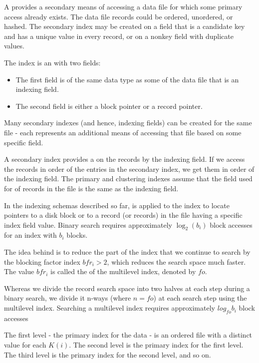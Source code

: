     \par A  provides a secondary means of accessing a data file for which some primary access already exists. The data file records could be ordered, unordered, or hashed. The secondary index may be created on a field that is a candidate key and has a unique value in every record, or on a nonkey field with duplicate values.
    \par The index is an  with two fields:
    \begin{itemize}
      \item The first field is of the same data type as some  of the data file that is an indexing field.
      \item The second field is either a block pointer or a record pointer.
    \end{itemize}
    \par Many secondary indexes (and hence, indexing fields) can be created for the same file - each represents an additional means of accessing that file based on some specific field.
    \par A secondary index provides a  on the records by the indexing field. If we access the records in order of the entries in the secondary index, we get them in order of the indexing field. The primary and clustering indexes assume that the field used for  of records in the file is the same as the indexing field.

  \par In the indexing schemas described so far,  is applied to the index to locate pointers to a disk block or to a record (or records) in the file having a specific index field value. Binary search requires approximately $\log_2(b_i)$ block accesses for an index with $b_i$ blocks.
  \par The idea behind  is to reduce the part of the index that we continue to search by the blocking factor index $bfr_i > 2$, which reduces the search space much faster. The value $bfr_i$ is called the  of the multilevel index, denoted by $fo$.
  \par Whereas we divide the record search space into two halves at each step during a binary search, we divide it n-ways (where $n = fo$) at each search step using the multilevel index. Searching a multilevel index requires approximately $log_{fo} b_i$ block accesses
  \par The first level - the primary index for the data - is an ordered file with a distinct value for each $K(i)$. The second level is the primary index for the first level. The third level is the primary index for the second level, and so on.

